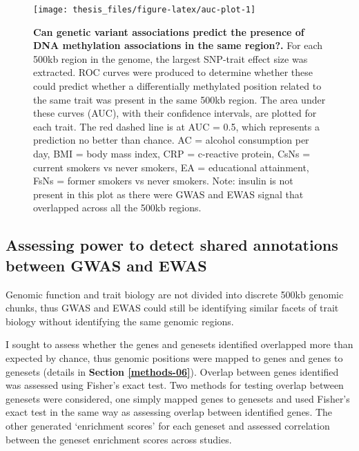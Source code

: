 \documentclass[11pt,oneside]{bristolthesis}
\begin{document}
\begin{figure}

{\centering \texttt{[image: thesis\_files/figure-latex/auc-plot-1]} 

}

\caption[Can genetic variant associations predict the presence of DNA methylation associations in the same region?]{\textbf{Can genetic variant associations predict the presence of DNA methylation associations in the same region?.} For each 500kb region in the genome, the largest SNP-trait effect size was extracted. ROC curves were produced to determine whether these could predict whether a differentially methylated position related to the same trait was present in the same 500kb region. The area under these curves (AUC), with their confidence intervals, are plotted for each trait. The red dashed line is at AUC = 0.5, which represents a prediction no better than chance. AC = alcohol consumption per day, BMI = body mass index, CRP = c-reactive protein, CsNs = current smokers vs never smokers, EA = educational attainment, FsNs = former smokers vs never smokers. Note: insulin is not present in this plot as there were GWAS and EWAS signal that overlapped across all the 500kb regions.}\label{fig:auc-plot}
\end{figure}
\hypertarget{assessing-power-sims}{%
\subsection{Assessing power to detect shared annotations between GWAS and EWAS}\label{assessing-power-sims}}

Genomic function and trait biology are not divided into discrete 500kb genomic chunks, thus GWAS and EWAS could still be identifying similar facets of trait biology without identifying the same genomic regions.

I sought to assess whether the genes and genesets identified overlapped more than expected by chance, thus genomic positions were mapped to genes and genes to genesets (details in \textbf{Section \ref{methods-06}}). Overlap between genes identified was assessed using Fisher's exact test. Two methods for testing overlap between genesets were considered, one simply mapped genes to genesets and used Fisher's exact test in the same way as assessing overlap between identified genes. The other generated `enrichment scores' for each geneset and assessed correlation between the geneset enrichment scores across studies.
\end{document}
